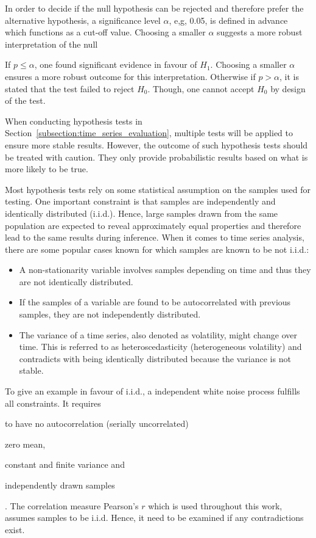 In order to decide if the null hypothesis can be rejected and therefore prefer the alternative hypothesis, a significance level $\alpha$, e,g, 0.05, is defined in advance which functions as a cut-off value. Choosing a smaller $\alpha$ suggests a more robust interpretation of the null

If $p \leq \alpha$, one found significant evidence in favour of $H_1$. Choosing a smaller $\alpha$ ensures a more robust outcome for this interpretation. Otherwise if $p > \alpha$, it is stated that the test failed to reject $H_0$. Though, one cannot accept $H_0$ by design of the test.

When conducting hypothesis tests in Section~\ref{subsection:time_series_evaluation}, multiple tests will be applied to ensure more stable results. However, the outcome of such hypothesis tests should be treated with caution. They only provide probabilistic results based on what is more likely to be true.

Most hypothesis tests rely on some statistical assumption on the samples used for testing. One important constraint is that samples are independently and identically distributed (i.i.d.). Hence, large samples drawn from the same population are expected to reveal approximately equal properties and therefore lead to the same results during inference. When it comes to time series analysis, there are some popular cases known for which samples are known to be not i.i.d.:
\begin{itemize}
    \item A non-stationarity variable involves samples depending on time and thus they are not identically distributed.
    \item If the samples of a variable are found to be autocorrelated with previous samples, they are not independently distributed.
    \item The variance of a time series, also denoted as volatility, might change over time. This is referred to as heteroscedasticity (heterogeneous volatility) and contradicts with being identically distributed because the variance is not stable.
\end{itemize}

To give an example in favour of i.i.d., a independent white noise process fulfills all constraints. It requires \begin{enumerate*}[label=(\roman*)]
    \item to have no autocorrelation (serially uncorrelated)
    \item zero mean,
    \item constant and finite variance and
    \item independently drawn samples
\end{enumerate*}. The correlation measure Pearson's $r$ which is used throughout this work, assumes samples to be i.i.d. Hence, it need to be examined if any contradictions exist.

